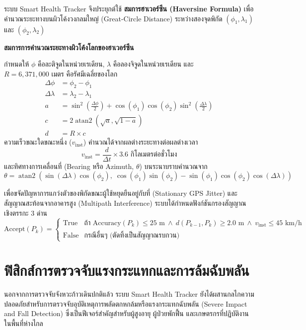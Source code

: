 ระบบ Smart Health Tracker จึงประยุกต์ใช้ \textbf{สมการฮาเวอร์ซีน (Haversine Formula)} เพื่อคำนวณระยะทางบนผิวโค้งวงกลมใหญ่ (Great-Circle Distance) ระหว่างสองจุดพิกัด $(\phi_1, \lambda_1)$ และ $(\phi_2, \lambda_2)$

\begin{theorybox}
\textbf{สมการการคำนวณระยะทางผิวโค้งโลกของฮาเวอร์ซีน}

กำหนดให้ $\phi$ คือละติจูดในหน่วยเรเดียน, $\lambda$ คือลองจิจูดในหน่วยเรเดียน และ $R = 6{,}371{,}000\text{ เมตร}$ คือรัศมีเฉลี่ยของโลก
\begin{align}
\Delta \phi &= \phi_2 - \phi_1 \\
\Delta \lambda &= \lambda_2 - \lambda_1 \\
a &= \sin^2\left(\frac{\Delta \phi}{2}\right) + \cos(\phi_1)\cos(\phi_2)\sin^2\left(\frac{\Delta \lambda}{2}\right) \\
c &= 2 \operatorname{atan2}\left(\sqrt{a}, \sqrt{1-a}\right) \\
d &= R \times c
\end{align}
ความเร็วขณะใดขณะหนึ่ง ($v_{\text{inst}}$) คำนวณได้จากผลต่างระยะทางต่อผลต่างเวลา
\begin{equation}
v_{\text{inst}} = \frac{d}{\Delta t} \times 3.6\text{ กิโลเมตรต่อชั่วโมง}
\end{equation}
และทิศทางการเคลื่อนที่ (Bearing หรือ Azimuth, $\theta$) บนระนาบราบคำนวณจาก
\begin{equation}
\theta = \operatorname{atan2}\left(\sin(\Delta \lambda)\cos(\phi_2), \; \cos(\phi_1)\sin(\phi_2) - \sin(\phi_1)\cos(\phi_2)\cos(\Delta \lambda)\right)
\end{equation}
\end{theorybox}

เพื่อขจัดปัญหาการแกว่งตัวของพิกัดขณะผู้ใช้หยุดยืนอยู่กับที่ (Stationary GPS Jitter) และสัญญาณสะท้อนจากอาคารสูง (Multipath Interference) ระบบได้กำหนดฟังก์ชันกรองสัญญาณเชิงตรรกะ 3 ด่าน
\begin{equation}
\text{Accept}(P_k) = 
\begin{cases}
\text{True} & \text{ถ้า } \text{Accuracy}(P_k) \le 25\text{ m} \ \land \ d(P_{k-1}, P_k) \ge 2.0\text{ m} \ \land \ v_{\text{inst}} \le 45\text{ km/h} \\
\text{False} & \text{กรณีอื่นๆ (ตัดทิ้งเป็นสัญญาณรบกวน)}
\end{cases}
\end{equation}

\section{ฟิสิกส์การตรวจจับแรงกระแทกและการล้มฉับพลัน}
นอกจากการตรวจจับจังหวะก้าวเดินปกติแล้ว ระบบ Smart Health Tracker ยังได้ผสานกลไกความปลอดภัยสำหรับการตรวจจับอุบัติเหตุการพลัดตกหกล้มหรือแรงกระแทกฉับพลัน (Severe Impact and Fall Detection) ซึ่งเป็นฟีเจอร์สำคัญสำหรับผู้สูงอายุ ผู้ป่วยพักฟื้น และเกษตรกรที่ปฏิบัติงานในพื้นที่ห่างไกล

